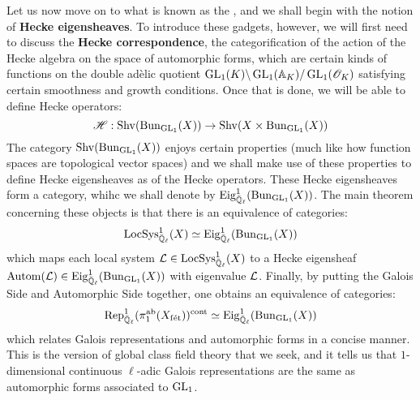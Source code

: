         Let us now move on to what is known as the , and we shall begin with the notion of \textbf{Hecke eigensheaves}. To introduce these gadgets, however, we will first need to discuss the \textbf{Hecke correspondence}, the categorification of the action of the Hecke algebra on the space of automorphic forms, which are certain kinds of functions on the double ad\`elic quotient $\operatorname{GL}_1(K) \backslash \operatorname{GL}_1(\mathbb{A}_K) / \operatorname{GL}_1(\mathscr{O}_K)$ satisfying certain smoothness and growth conditions. Once that is done, we will be able to define Hecke operators:
            $$\scrH: \Shv(\Bun_{\GL_1}(X)) \to \Shv(X \x \Bun_{\GL_1}(X))$$
        The category $\mathrm{Shv}(\mathrm{Bun}_{\operatorname{GL}_1}(X))$ enjoys certain  properties (much like how function spaces are topological vector spaces) and we shall make use of these properties to define Hecke eigensheaves as  of the Hecke operators. These Hecke eigensheaves form a category, whihc we shall denote by $\mathrm{Eig}^1_{\bar{\mathbb{Q}}_{\ell}}(\mathrm{Bun}_{\operatorname{GL}_1}(X))$. The main theorem concerning these objects is that there is an equivalence of categories:
            $$\mathrm{LocSys}_{\bar{\mathbb{Q}}_{\ell}}^1(X) \simeq \mathrm{Eig}^1_{\bar{\mathbb{Q}}_{\ell}}(\mathrm{Bun}_{\operatorname{GL}_1}(X))$$
        which maps each local system $\mathcal{L} \in \mathrm{LocSys}_{\bar{\mathbb{Q}}_{\ell}}^1(X)$ to a Hecke eigensheaf $\mathrm{Autom}(\mathcal{L}) \in \mathrm{Eig}^1_{\bar{\mathbb{Q}}_{\ell}}(\mathrm{Bun}_{\operatorname{GL}_1}(X))$ with eigenvalue $\mathcal{L}$. Finally, by putting the Galois Side and Automorphic Side together, one obtains an equivalence of categories:
            $$\mathrm{Rep}_{\bar{\mathbb{Q}}_{\ell}}^1(\pi_1^{\mathrm{ab}}(X_{\mathrm{f\acute{e}t}}))^{\mathrm{cont}} \simeq \mathrm{Eig}^1_{\bar{\mathbb{Q}}_{\ell}}(\mathrm{Bun}_{\operatorname{GL}_1}(X))$$
        which relates Galois representations and automorphic forms in a concise manner. This is the version of global class field theory that we seek, and it tells us that $1$-dimensional continuous $\ell$-adic Galois representations are the same as automorphic forms associated to $\operatorname{GL}_1$.
        
